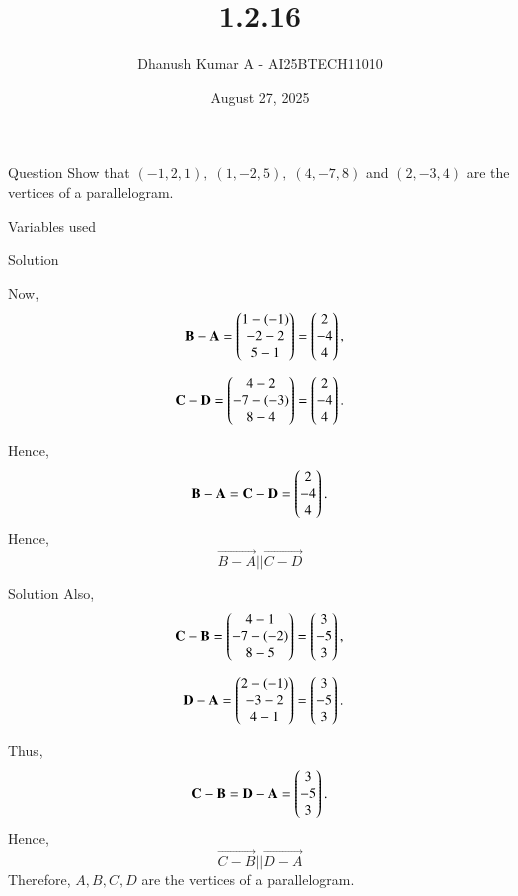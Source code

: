 \documentclass{beamer}
\title 
{1.2.16}
\date{August 27, 2025}
\author 
{Dhanush Kumar A - AI25BTECH11010}
\begin{document}
\frame{\titlepage}
\begin{frame}{Question}
 Show that $(-1,2,1), \; (1,-2,5), \; (4,-7,8)$ and $(2,-3,4)$ are the vertices of a parallelogram.
\end{frame}
\begin{frame}{Variables used}
\begin{table}[H]    
  \centering
  
  \caption{Variables Used}
  \label{tab:1.2.16}
\end{table}
\end{frame}
\begin{frame}{Solution}

	Now,
  \begin{align}
 \mathbf{B - A}= \begin{pmatrix}1 - (-1) \\ -2 - 2 \\ 5 - 1\end{pmatrix} = \begin{pmatrix}2 \\ -4 \\ 4\end{pmatrix}, \\[6pt]
\mathbf{C - D} = \begin{pmatrix}4 - 2 \\ -7 - (-3) \\ 8 - 4\end{pmatrix}= \begin{pmatrix}2 \\ -4 \\ 4\end{pmatrix}.
 \end{align}

 Hence,
 \begin{align}
        \mathbf{B - A} = \mathbf{C - D}= \begin{pmatrix}2 \\ -4 \\ 4\end{pmatrix}
    .
 \end{align}
 Hence,
 \[ \vec{B - A} ||\vec{C - D }\]
\end{frame}
	\begin{frame}{Solution}
 Also,
 \begin{align}
  \mathbf{C - B}= \begin{pmatrix}4 - 1 \\ -7 - (-2) \\ 8 - 5\end{pmatrix} = \begin{pmatrix}3 \\ -5 \\ 3\end{pmatrix}, \\[6pt]
   \mathbf{D - A }= \begin{pmatrix}2 - (-1) \\ -3 - 2 \\4 -1\end{pmatrix}= \begin{pmatrix}3 \\ -5 \\ 3\end{pmatrix}.
 \end{align}
 
 Thus,
 \begin{align}
     \mathbf{C - B}= \mathbf{D - A} = \begin{pmatrix}3 \\ -5 \\ 3\end{pmatrix}
    .
 \end{align}
 Hence,
  \[ \vec{C - B} ||\vec{D - A }\]
\bigskip
 \noindent                                            
	Therefore, $A, B, C, D$ are the vertices of a parallelogram.

\end{frame}
\end{document}
